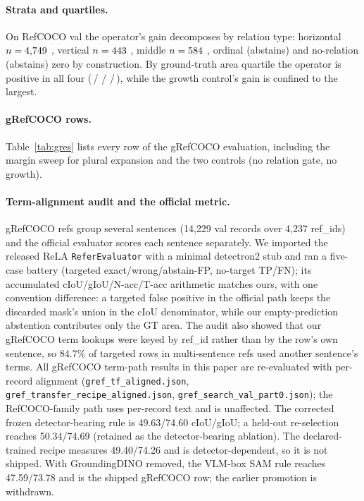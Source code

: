 \paragraph{Strata and quartiles.}
On RefCOCO val the operator's gain decomposes by relation type: horizontal
$n=4{,}749$ \strataHorizontalD, vertical $n=443$
\strataVerticalD, middle $n=584$ \strataMiddleD, ordinal
(abstains) and no-relation (abstains) zero by construction. By ground-truth
area quartile the operator is positive in all four
(\oursQOne\,/\,\oursQTwo\,/\,\oursQThree\,/\,\oursQFour), while the growth
control's gain is confined to the largest.

\paragraph{gRefCOCO rows.}
Table~\ref{tab:gres} lists every row of the gRefCOCO evaluation, including
the margin sweep for plural expansion and the two controls (no relation
gate, no growth).

\paragraph{Term-alignment audit and the official metric.}
gRefCOCO refs group several sentences (14{,}229 val records over 4{,}237
ref\_ids) and the official evaluator scores each sentence separately. We
imported the released ReLA \texttt{ReferEvaluator} with a minimal
detectron2 stub and ran a five-case battery (targeted exact/wrong/abstain-FP,
no-target TP/FN); its accumulated cIoU/gIoU/N-acc/T-acc arithmetic matches
ours, with one convention difference: a targeted false positive in the
official path keeps the discarded mask's union in the cIoU denominator, while
our empty-prediction abstention contributes only the GT area. The audit also
showed that our gRefCOCO term lookups were keyed by ref\_id rather than by the
row's own sentence, so 84.7\% of targeted rows in multi-sentence refs used
another sentence's terms. All gRefCOCO term-path results in this paper are
re-evaluated with per-record alignment
(\texttt{gref\_tf\_aligned.json}, \texttt{gref\_transfer\_recipe\_aligned.json},
\texttt{gref\_search\_val\_part0.json}); the RefCOCO-family path uses
per-record text and is unaffected. The corrected frozen detector-bearing rule is
49.63/74.60 cIoU/gIoU; a held-out re-selection reaches 50.34/74.69 (retained as
the detector-bearing ablation). The declared-trained recipe measures
49.40/74.26 and is detector-dependent, so it is not shipped. With GroundingDINO
removed, the VLM-box SAM rule reaches 47.59/73.78 and is the shipped gRefCOCO
row; the earlier promotion is withdrawn.

